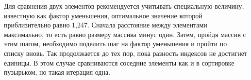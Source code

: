 Для сравнения двух элементов рекомендуется учитывать специальную величину, известную как фактор уменьшения, оптимальное значение которой приблизительно равно 1,247. 
Сначала расстояние между элементами максимально, то есть равно размеру массива минус один. 
Затем, пройдя массив с этим шагом, необходимо поделить шаг на фактор уменьшения и пройти по списку вновь. 
Так продолжается до тех пор, пока разность индексов не достигнет единицы. 
В этом случае сравниваются соседние элементы как и в сортировке пузырьком, но такая итерация одна.
